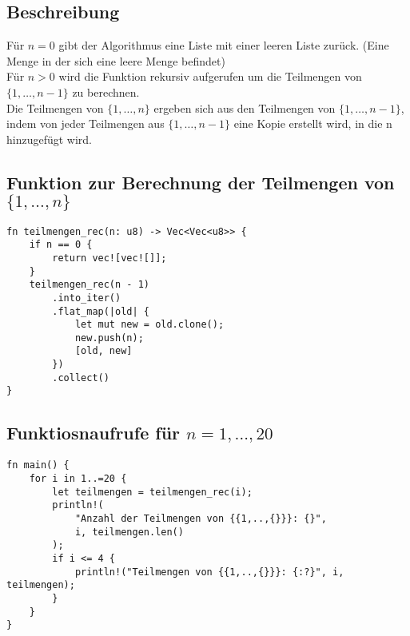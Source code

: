 \documentclass[a4paper]{scrartcl}
\begin{document}
\subsection*{Beschreibung}
Für $n = 0$ gibt der Algorithmus eine Liste mit einer leeren Liste zurück. (Eine Menge in der sich eine leere Menge befindet)\\
Für $n > 0$ wird die Funktion rekursiv aufgerufen um die Teilmengen von $\{1, \ldots, n-1\}$ zu berechnen.\\
Die Teilmengen von $\{1, \ldots, n\}$ ergeben sich aus den Teilmengen von $\{1, \ldots, n-1\}$, indem von jeder Teilmengen aus $\{1, \ldots, n-1\}$ eine Kopie erstellt wird, in die n hinzugefügt wird.\\
\newpage
\subsection*{Funktion zur Berechnung der Teilmengen von $\{1, \ldots, n\}$}
\begin{lstlisting}
fn teilmengen_rec(n: u8) -> Vec<Vec<u8>> {
    if n == 0 {
        return vec![vec![]];
    } 
    teilmengen_rec(n - 1)
        .into_iter()
        .flat_map(|old| {
            let mut new = old.clone();
            new.push(n);
            [old, new]
        })
        .collect()
}
\end{lstlisting}

\subsection*{Funktiosnaufrufe für $n = 1, \ldots, 20$}
\begin{lstlisting}
fn main() {
    for i in 1..=20 {
        let teilmengen = teilmengen_rec(i);
        println!(
            "Anzahl der Teilmengen von {{1,..,{}}}: {}", 
            i, teilmengen.len()
        );
        if i <= 4 {
            println!("Teilmengen von {{1,..,{}}}: {:?}", i, teilmengen);
        }
    }  
}
\end{lstlisting}

\newpage
\end{document}

